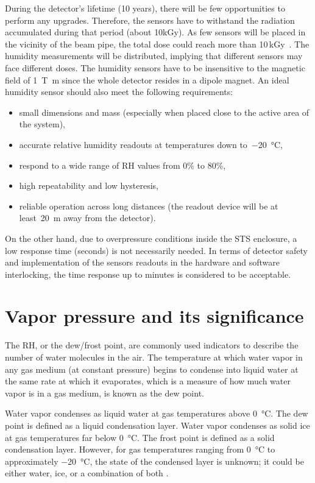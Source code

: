 During the detector's lifetime (10 years), there will be few opportunities to perform any upgrades. Therefore, the sensors have to withstand the radiation accumulated during that period (about 10kGy). As few sensors will be placed in the vicinity of the beam pipe, the total dose could reach more than 10\,kGy~\cite{Heuser:54798}. The humidity measurements will be distributed, implying that different sensors may face different doses. 
The humidity sensors have to be insensitive to the magnetic field of \SI{1}{\tesla\metre} since the whole detector resides in a dipole magnet.  An ideal humidity sensor should also meet the following requirements:
\begin{itemize}
    \item small dimensions and mass (especially when placed close to the active area of the system),
    \item accurate relative humidity readouts at temperatures down to~\SI{-20}{\celsius}, 
    \item respond to a wide range of \gls{RH} values from 0\% to 80\%,
    \item high repeatability and low hysteresis,
    \item reliable operation across long distances (the readout device will be at least~\SI{20}{\metre} away from the detector).
\end{itemize}

On the other hand, due to overpressure conditions inside the \gls{STS} enclosure, a low response time (seconds) is not necessarily needed. In terms of detector safety and implementation of the sensors readouts in the hardware and software interlocking, the time response up to minutes is considered to be acceptable. 

\section{Vapor pressure and its significance}

The \gls{RH}, or the dew/frost point, are commonly used indicators to describe the number of water molecules in the air. The temperature at which water vapor in any gas medium (at constant pressure) begins to condense into liquid water at the same rate at which it evaporates, which is a measure of how much water vapor is in a gas medium, is known as the dew point.

Water vapor condenses as liquid water at gas temperatures above \SI{0}{\celsius}. The dew point is defined as a liquid condensation layer. Water vapor condenses as solid ice at gas temperatures far below \SI{0}{\celsius}. The frost point is defined as a solid condensation layer. However, for gas temperatures ranging from \SI{0}{\celsius} to approximately \SI{-20}{\celsius}, the state of the condensed layer is unknown; it could be either water, ice, or a combination of both \cite{nie_dewpoint}. 


